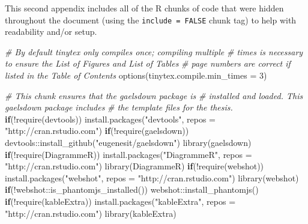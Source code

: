 \documentclass[12pt, oneside]{queensuthesis}
\numberwithin{equation}{chapter}       %
\newenvironment{Shaded}{\begin{snugshade}}{\end{snugshade}}
\newcommand{\AttributeTok}[1]{\textcolor[rgb]{0.77,0.63,0.00}{#1}}
\newcommand{\CommentTok}[1]{\textcolor[rgb]{0.56,0.35,0.01}{\textit{#1}}}
\newcommand{\ControlFlowTok}[1]{\textcolor[rgb]{0.13,0.29,0.53}{\textbf{#1}}}
\newcommand{\DecValTok}[1]{\textcolor[rgb]{0.00,0.00,0.81}{#1}}
\newcommand{\FunctionTok}[1]{\textcolor[rgb]{0.00,0.00,0.00}{#1}}
\newcommand{\NormalTok}[1]{#1}
\newcommand{\SpecialCharTok}[1]{\textcolor[rgb]{0.00,0.00,0.00}{#1}}
\newcommand{\StringTok}[1]{\textcolor[rgb]{0.31,0.60,0.02}{#1}}
\begin{document}
This second appendix includes all of the R chunks of code that were hidden throughout the document (using the \texttt{include\ =\ FALSE} chunk tag) to help with readability and/or setup.
\begin{Shaded}
\begin{Highlighting}[]
\CommentTok{\# By default tinytex only compiles once; compiling multiple}
\CommentTok{\# times is necessary to ensure the List of Figures and List of Tables}
\CommentTok{\# page numbers are correct if listed in the Table of Contents}
\FunctionTok{options}\NormalTok{(}\AttributeTok{tinytex.compile.min\_times =} \DecValTok{3}\NormalTok{)}

\CommentTok{\# This chunk ensures that the gaelsdown package is}
\CommentTok{\# installed and loaded. This gaelsdown package includes}
\CommentTok{\# the template files for the thesis.}
\ControlFlowTok{if}\NormalTok{(}\SpecialCharTok{!}\FunctionTok{require}\NormalTok{(devtools))}
  \FunctionTok{install.packages}\NormalTok{(}\StringTok{"devtools"}\NormalTok{, }\AttributeTok{repos =} \StringTok{"http://cran.rstudio.com"}\NormalTok{)}
\ControlFlowTok{if}\NormalTok{(}\SpecialCharTok{!}\FunctionTok{require}\NormalTok{(gaelsdown))}
\NormalTok{  devtools}\SpecialCharTok{::}\FunctionTok{install\_github}\NormalTok{(}\StringTok{"eugenesit/gaelsdown"}\NormalTok{)}
\FunctionTok{library}\NormalTok{(gaelsdown)}
\ControlFlowTok{if}\NormalTok{(}\SpecialCharTok{!}\FunctionTok{require}\NormalTok{(DiagrammeR))}
  \FunctionTok{install.packages}\NormalTok{(}\StringTok{"DiagrammeR"}\NormalTok{, }\AttributeTok{repos =} \StringTok{"http://cran.rstudio.com"}\NormalTok{)}
\FunctionTok{library}\NormalTok{(DiagrammeR)}
\ControlFlowTok{if}\NormalTok{(}\SpecialCharTok{!}\FunctionTok{require}\NormalTok{(webshot))}
  \FunctionTok{install.packages}\NormalTok{(}\StringTok{"webshot"}\NormalTok{, }\AttributeTok{repos =} \StringTok{"http://cran.rstudio.com"}\NormalTok{)}
\FunctionTok{library}\NormalTok{(webshot)}
\ControlFlowTok{if}\NormalTok{(}\SpecialCharTok{!}\NormalTok{webshot}\SpecialCharTok{::}\FunctionTok{is\_phantomjs\_installed}\NormalTok{())}
\NormalTok{  webshot}\SpecialCharTok{::}\FunctionTok{install\_phantomjs}\NormalTok{()}
\ControlFlowTok{if}\NormalTok{(}\SpecialCharTok{!}\FunctionTok{require}\NormalTok{(kableExtra))}
  \FunctionTok{install.packages}\NormalTok{(}\StringTok{"kableExtra"}\NormalTok{, }\AttributeTok{repos =} \StringTok{"http://cran.rstudio.com"}\NormalTok{)}
\FunctionTok{library}\NormalTok{(kableExtra)}
\end{Highlighting}
\end{Shaded}
\end{document}
